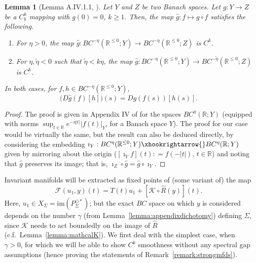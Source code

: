 \documentclass[a4paper, 12pt, oneside, reqno, notitlepage]{amsart}
\theoremstyle{plain}
\newtheorem{lemma}[theorem]{Lemma}
\theoremstyle{definition}
\theoremstyle{remark}
\newcommand{\im}{\mathrm{im}}
\begin{document}
\begin{lemma}[Lemma A.IV.1.1, \cite{diekmann2012delay}] \label{lemma:compositionBC}
    Let $Y$ and $Z$ be two Banach spaces.
    Let $g:Y \to Z$ be a $C^k_b$ mapping with  $g(0) = 0$, $k \geq 1$.
    Then, the map $\hat{g} : f \mapsto g \circ f$ satisfies the following.
    \begin{enumerate}[label=\upshape{(\roman*)}]
        \item \label{item_comp1} For $\eta > 0$, the map $\hat{g}: BC^{-\eta} (\mathbb{R}^{\leq 0};Y) \to BC^{-\eta} (\mathbb{R}^{\leq 0};Z)$ is $C^k$.
        \item \label{item_comp2} For $\eta, \tilde{\eta} < 0$ such that $\tilde{\eta} <k\eta$, the map $ \hat{g}: BC^{-{\eta}} (\mathbb{R}^{\leq 0};Y) \to BC^{-\tilde{\eta}} (\mathbb{R}^{\leq 0};Z)$ is $C^k$.
    \end{enumerate}
    In both cases, for $f,h \in BC^{-{\eta}} (\mathbb{R}^{\leq 0};Y) $,
    \begin{equation}
       \big( D \hat{g}(f) [h] \big) (s) = Dg(f(s)) [h(s)].
       \label{eq:derivRhat}
    \end{equation}
\end{lemma}

\begin{proof}
    The proof is given in Appendix IV of \cite{diekmann2012delay} for the spaces $BC^\eta(\mathbb{R};Y)$ (equipped with norms $\sup_{t \in \mathbb{R}} e^{-\eta|t|} |f(t)|_Y$, for a Banach space $Y$).
    The proof for our case would be virtually the same, but the result can also be deduced directly, by considering the embedding $\imath_Y : BC^{\eta} (\mathbb{R}^{\leq 0};Y) \xhookrightarrow{} BC^\eta(\mathbb{R};Y)$ given by mirroring about the origin ($[\imath_Yf](t) : = f(-|t|)$, $t \in \mathbb{R}$) and noting that $\widehat{g}$ preserves its image; that is, $\imath_{Z} \circ \hat{g} =  \hat{g}\circ\imath_Y$.
\end{proof}


Invariant manifolds will be extracted as fixed points of (some variant of) the map
\begin{equation}
    \mathcal{F}(u_1,y) (t) = T(t) u_1 + [\mathcal{K} \circ \widehat{R} (y)](t).
    \label{eq:contraction}
\end{equation}
Here, $u_1 \in X_\Sigma = \im(P_\Sigma^{\odot *})$; but the exact $BC$ space on which $y$ is considered depends on the number $\gamma$ (from Lemma~\ref{lemma:appendixdichotomy}) defining $\Sigma$, since $\mathcal{K}$ needs to act boundedly on the image of $\widehat{R}$  (c.f.\ Lemma~\ref{lemma:mathcalK}).
We first deal with the simplest case, when $\gamma > 0$, for which we will be able to show $C^k$ smoothness without any spectral gap assumptions (hence proving the statements of Remark~\ref{remark:strongmfds}).
\end{document}
